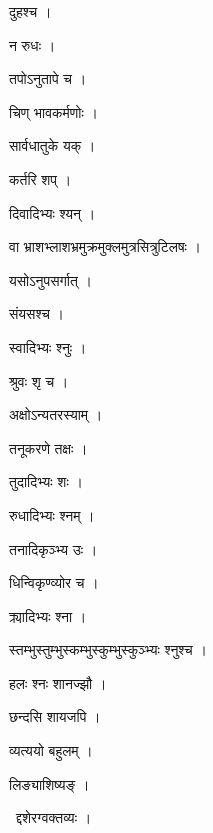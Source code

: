 \documentclass[10pt, openany, oneside]{book}
\begin{document}
\noindent दुहश्च ।

\noindent न रुधः ।

\noindent तपोऽनुतापे च ।

\noindent चिण् भावकर्मणोः ।

\noindent सार्वधातुके यक् ।

\noindent कर्तरि शप् ।

\noindent दिवादिभ्यः श्यन् ।

\noindent वा भ्राशभ्लाशभ्रमुक्रमुक्लमुत्रसित्रुटिलषः ।

\noindent यसोऽनुपसर्गात् ।

\noindent संयसश्च ।

\noindent स्वादिभ्यः श्नुः ।

\noindent श्रुवः श‍ृ च ।

\noindent अक्षोऽन्यतरस्याम् ।

\noindent तनूकरणे तक्षः ।

\noindent तुदादिभ्यः शः ।

\noindent रुधादिभ्यः श्नम् ।

\noindent तनादिकृञ्भ्य उः ।

\noindent धिन्विकृण्व्योर च ।

\noindent क्र्यादिभ्यः श्ना ।

\noindent स्तम्भुस्तुम्भुस्कम्भुस्कुम्भुस्कुञ्भ्यः श्नुश्च ।

\noindent हलः श्नः शानज्झौ ।

\noindent छन्दसि शायजपि ।

\noindent व्यत्ययो बहुलम् ।

\noindent लिङ्याशिष्यङ् ।

\par\noindent\hspace{1.5em}{\vps वा॰}~{\qt द्दशेरग्वक्तव्यः ।}
\end{document}
